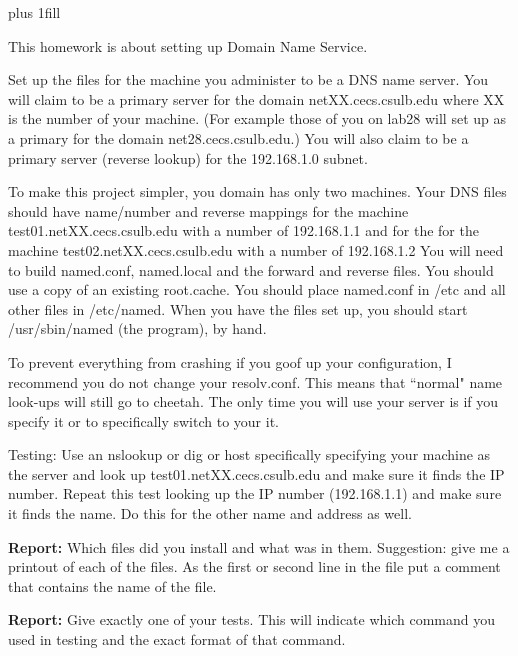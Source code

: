 
\rightskip=0pt plus 1fill

\parindent 0pt

This homework is about setting up Domain Name Service.

Set up the files for the machine you administer
to be a DNS name server. 
You will claim to be a primary server for the domain netXX.cecs.csulb.edu 
where XX is the number of your machine.
(For example those of you on lab28 will set up as a primary
for the domain net28.cecs.csulb.edu.)
You will also claim to be a primary
server (reverse lookup) for the 192.168.1.0 subnet.

To make this project simpler, you domain has only two machines.
Your DNS files should have name/number and reverse mappings
for the machine {\ltt{}test01.netXX.cecs.csulb.edu} 
with a number of {\ltt{}192.168.1.1}
and for the 
for the machine {\ltt{}test02.netXX.cecs.csulb.edu} 
with a number of {\ltt{}192.168.1.2}
You will need to build {\ltt{}named.conf},
{\ltt{}named.local} and the forward and reverse files.
You should use a copy of an existing {\ltt{}root.cache}.
You should place {\ltt{}named.conf} in {\ltt{}/etc}
and all other files in {\ltt{}/etc/named}.
When you have the files set up, you should start {\ltt{}/usr/sbin/named} 
(the program), by hand.

To prevent everything from crashing if you goof up your configuration,
I recommend you do not change your {\ltt{}resolv.conf}.
This means that ``normal" name look-ups will still go to {\ltt{}cheetah}.
The only time you will use your server is if you specify it or
to specifically switch to your it.

Testing: Use an {\ltt{}nslookup} or {\ltt{}dig} or {\ltt{}host}
specifically specifying your machine as the server and look up
{\ltt{}test01.netXX.cecs.csulb.edu} and make sure it finds the IP number.
Repeat this test looking up the IP number ({\ltt{}192.168.1.1})
and make sure it finds the name.
Do this for the other name and address as well.

{\bf Report:} Which files did you install and what was in them.
Suggestion: give me a printout of each of the files. As the first or second
line in the file put a comment that contains the name of the file.

{\bf Report:} Give exactly one of your tests.
This will indicate which command you used in testing and the
exact format of that command.

\bye
